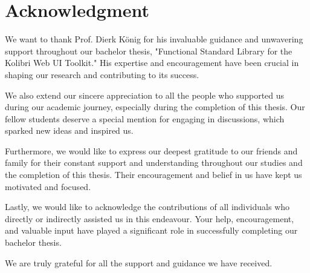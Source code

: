 \chapter{Acknowledgment}
We want to thank Prof. Dierk König for his invaluable guidance and unwavering
support throughout our bachelor thesis, "Functional Standard Library for the
Kolibri Web UI Toolkit." His expertise and encouragement have been crucial in
shaping our research and contributing to its success.

We also extend our sincere appreciation to all the people who supported us
during our academic journey, especially during the completion of this thesis.
Our fellow students deserve a special mention for engaging in discussions,
which sparked new ideas and inspired us.

Furthermore, we would like to express our deepest gratitude to our friends and
family for their constant support and understanding throughout our studies and
the completion of this thesis. Their encouragement and belief in us have kept
us motivated and focused.

Lastly, we would like to acknowledge the contributions of all individuals who
directly or indirectly assisted us in this endeavour. Your help, encouragement,
and valuable input have played a significant role in successfully completing
our bachelor thesis.

We are truly grateful for all the support and guidance we have received.
